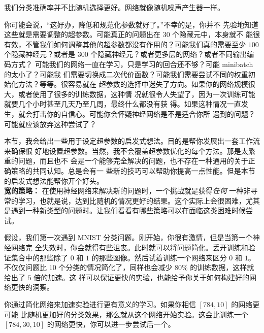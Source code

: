 我们分类准确率并不比随机选择更好。网络就像随机噪声产生器一样。

你可能会说，“这好办，降低\learningrate{}和规范化参数就好了。”不幸的是，你并不
先验地知道这些就是需要调整的超参数。可能真正的问题出在 $30$ 个隐藏元中，本身就不
能很有效，不管我们如何调整其他的超参数都没有作用的？可能我们真的需要至少 $100$
个隐藏神经元？或者是 $300$ 个隐藏神经元？或者更多层的网络？或者不同输出编码方式？
可能我们的网络一直在学习，只是学习的回合还不够？可能 minibatch 的太小了？可能我
们需要切换成二次代价函数？可能我们需要尝试不同的权重初始化方法？等等。很容易就在
超参数的选择中迷失了方向。如果你的网络规模很大，或者使用了很多的训练数据，这种情
况就很令人失望了，因为一次训练可能就要几个小时甚至几天乃至几周，最终什么都没有获
得。如果这种情况一直发生，就会打击你的自信心。可能你会怀疑神经网络是不是适合你所
遇到的问题？可能就应该放弃这种尝试了？

本节，我会给出一些用于设定超参数的启发式想法。目的是帮你发展出一套工作流来确保很
好地设置超参数。当然，我不会覆盖超参数优化的每个方法。那是太繁重的问题，而且也不
会是一个能够完全解决的问题，也不存在一种通用的关于正确策略的共同认知。总是会有一
些新的技巧可以帮助你提高一点性能。但是本节的启发式想法能帮你开个好头。\\

\textbf{宽的策略：} 在使用神经网络来解决新的问题时，一个挑战就是获得\emph{任何}
一种非寻常的学习，也就是说，达到比随机的情况更好的结果。这个实际上会很困难，尤其
是遇到一种新类型的问题时。让我们看看有哪些策略可以在面临这类困难时候尝试。

假设，我们第一次遇到 MNIST 分类问题。刚开始，你很有激情，但是当第一个神经网络完
全失效时，你会就得有些沮丧。此时就可以将问题简化。丢开训练和验证集合中的那些除了
$0$ 和 $1$ 的那些图像。然后试着训练一个网络来区分 $0$ 和 $1$。不仅仅问题比 $10$
个分类的情况简化了，同样也会减少 80\% 的训练数据，这样就给出了 $5$ 倍的加速。这
样可以保证更快的实验，也能给予你关于如何构建好的网络更快的洞察。

你通过简化网络来加速实验进行更有意义的学习。如果你相信 $[784, 10]$ 的网络更可能
比随机更加好的分类效果，那么就从这个网络开始实验。这会比训练一个 $[784, 30 ,10]$
的网络更快，你可以进一步尝试后一个。

